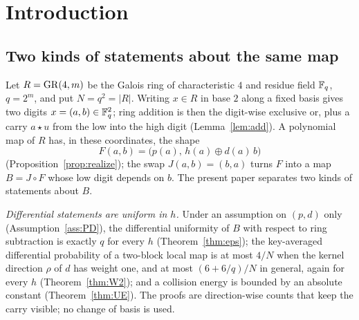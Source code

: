 \section{Introduction}\label{sec:intro}

\subsection{Two kinds of statements about the same map}
Let $R=\mathrm{GR}(4,m)$ be the Galois ring of characteristic $4$ and residue field $\mathbb{F}_q$, $q=2^m$, and put $N=q^2=|R|$.
Writing $x\in R$ in base $2$ along a fixed basis gives two digits $x=(a,b)\in\mathbb{F}_q^2$; ring addition
is then the digit-wise exclusive or, plus a carry $a\star u$ from the low into the high digit
(Lemma~\ref{lem:add}). A polynomial map of $R$ has, in these coordinates, the shape
\[
  F(a,b)=\bigl(p(a),\,h(a)\oplus d(a)\,b\bigr)
\]
(Proposition~\ref{prop:realize}); the swap $J(a,b)=(b,a)$ turns $F$ into a map $B=J\circ F$ whose
low digit depends on $b$. The present paper separates two kinds of statements about $B$.

\emph{Differential statements are uniform in $h$.} Under an assumption on $(p,d)$ only
(Assumption~\ref{ass:PD}), the differential uniformity of $B$ with respect to ring subtraction is
exactly $q$ for every $h$ (Theorem~\ref{thm:eps}); the key-averaged differential probability of a
two-block local map is at most $4/N$ when the kernel direction $\rho$ of $d$ has weight one, and
at most $(6+6/q)/N$ in general, again for every $h$ (Theorem~\ref{thm:W2}); and a collision energy
is bounded by an absolute constant (Theorem~\ref{thm:UE}). The proofs are direction-wise counts
that keep the carry visible; no change of basis is used.


